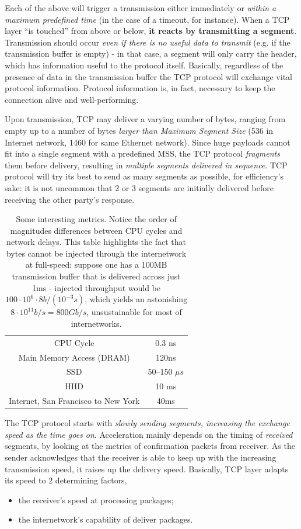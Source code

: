\documentclass[10pt]{\classname}
\begin{document}
Each of the above will trigger a transmission either immediately or
\emph{within a maximum predefined time} (in the case of a timeout, for
instance). When a TCP layer ``is touched'' from above or below, \textbf{it reacts
by transmitting a segment}. Transmission should occur \emph{even if there is no
useful data to transmit} (e.g. if the transmission buffer is empty) \-- in that
case, a segment will only carry the header, which has information useful to the
protocol itself. Basically, regardless of the presence of data in the
transmission buffer the TCP protocol will exchange vital protocol information.
Protocol information is, in fact, necessary to keep the connection alive and
well-performing.

Upon transmission, TCP may deliver a varying number of bytes, ranging from
empty up to a number of bytes \emph{larger than Maximum Segment Size} (536 in
Internet network, 1460 for same Ethernet network). Since huge payloads cannot
fit into a single segment with a predefined MSS, the TCP protocol
\emph{fragments} them before delivery, resulting in \emph{multiple segments
delivered in sequence}. TCP protocol will try its best to send as many segments
as possible, for efficiency's sake: it is not uncommon that $2$ or $3$ segments
are initially delivered before receiving the other party's response.

\begin{table}[ht]
\centering
\begin{tabular}{cc}
CPU Cycle & 0.3 ns \\
Main Memory Access (DRAM) & 120ns \\
SSD & 50--150 $\mu s$ \\
HHD & 10 ms \\
Internet, San Francisco to New York & 40ms
\end{tabular}
\caption{Some interesting metrics. Notice the order of magnitudes differences
between CPU cycles and network delays. This table highlights the fact that
bytes cannot be injected through the internetwork at full\--speed: suppose one
has a 100MB transmission buffer that is delivered across just 1ms \--
injected throughput would be $100 \cdot 10^6 \cdot 8 b/(10^{-3} s)$, which
yields an astonishing $8 \cdot 10^{11} b/s = 800 Gb/s$, unsustainable for most
of internetworks.}
\label{tab:SomeMetrics}
\end{table}
\bigskip

The TCP protocol starts with \emph{slowly sending segments, increasing the exchange
speed as the time goes on}. Acceleration mainly depends on the timing of
\emph{received} segments, by looking at the metrics of confirmation packets
from receiver. As the sender acknowledges that the receiver is able to keep up
with the increasing transmission speed, it raises up the delivery speed. Basically, TCP layer adapts its speed to $2$ determining factors,
\begin{itemize}
    \item the receiver's speed at processing packages;
    \item the internetwork's capability of deliver packages.
\end{itemize}
\end{document}

